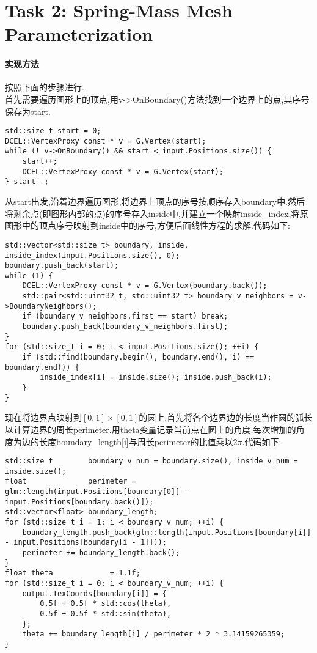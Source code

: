 \documentclass{ctexart}
\begin{document}
\section*{Task 2: Spring-Mass Mesh Parameterization}
\paragraph{实现方法}
按照下面的步骤进行.\\
\indent 首先需要遍历图形上的顶点,用{\codefont v->OnBoundary()}方法找到一个边界上的点,其序号保存为{\codefont start}.
\begin{lstlisting}
std::size_t start = 0;
DCEL::VertexProxy const * v = G.Vertex(start);
while (! v->OnBoundary() && start < input.Positions.size()) {
    start++;
    DCEL::VertexProxy const * v = G.Vertex(start);
} start--;
\end{lstlisting}
\indent 从{\codefont start}出发,沿着边界遍历图形,将边界上顶点的序号按顺序存入{\codefont boundary}中.然后将剩余点(即图形内部的点)的序号存入{\codefont inside}中,并建立一个映射{\codefont inside\_index},将原图形中的顶点序号映射到{\codefont inside}中的序号,方便后面线性方程的求解.代码如下:
\begin{lstlisting}
std::vector<std::size_t> boundary, inside, inside_index(input.Positions.size(), 0);
boundary.push_back(start);
while (1) {
    DCEL::VertexProxy const * v = G.Vertex(boundary.back());
    std::pair<std::uint32_t, std::uint32_t> boundary_v_neighbors = v->BoundaryNeighbors();
    if (boundary_v_neighbors.first == start) break;
    boundary.push_back(boundary_v_neighbors.first);
}
for (std::size_t i = 0; i < input.Positions.size(); ++i) {
    if (std::find(boundary.begin(), boundary.end(), i) == boundary.end()) {
        inside_index[i] = inside.size(); inside.push_back(i);
    }
}
\end{lstlisting}
现在将边界点映射到$[0,1]\times[0,1]$的圆上.首先将各个边界边的长度当作圆的弧长以计算边界的周长{\codefont perimeter}.用{\codefont theta}变量记录当前点在圆上的角度,每次增加的角度为边的长度{\codefont boundary\_length[i]}与周长{\codefont perimeter}的比值乘以$2\pi$.代码如下:
\begin{lstlisting}
std::size_t        boundary_v_num = boundary.size(), inside_v_num = inside.size();
float              perimeter = glm::length(input.Positions[boundary[0]] - input.Positions[boundary.back()]);
std::vector<float> boundary_length;
for (std::size_t i = 1; i < boundary_v_num; ++i) {
    boundary_length.push_back(glm::length(input.Positions[boundary[i]] - input.Positions[boundary[i - 1]]));
    perimeter += boundary_length.back();
}
float theta             = 1.1f;
for (std::size_t i = 0; i < boundary_v_num; ++i) {
    output.TexCoords[boundary[i]] = {
        0.5f + 0.5f * std::cos(theta),
        0.5f + 0.5f * std::sin(theta),
    };
    theta += boundary_length[i] / perimeter * 2 * 3.14159265359;
}
\end{lstlisting}
\end{document}
